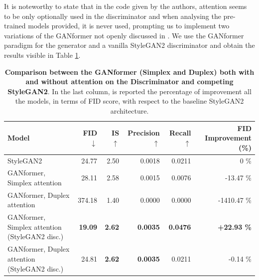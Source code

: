 \documentclass{article}
\begin{document}
	It is noteworthy to state that in the code given by the authors, attention seems to be only optionally 
	used in the discriminator and when analysing the pre-trained models provided, it is never used,
	prompting us to implement two variations of the GANformer not openly 
	discussed in \cite{hudson2021generative}.
	We use the GANformer paradigm for the generator and a vanilla StyleGAN2 discriminator and 
	obtain the results visible in Table \ref{tab:our-results2}.
	\begin{table}[htb]
		\centering
		\caption{\textbf{Comparison between the GANformer (Simplex and Duplex) both with and without 
				attention on the Discriminator and competing StyleGAN2}.  In the last column, is reported 
			the 
			percentage of improvement all the models, in terms of FID score, with respect to the baseline 
			StyleGAN2 architecture.}
		\label{tab:our-results2}
		\vspace{3mm}
		\small
		\begin{tabular}{l|rrrrr}
			\toprule
			
			\textbf{Model}  & \textbf{FID $\downarrow$}  & \textbf{IS $\uparrow$} & 
			\textbf{Precision$\uparrow$}  & \textbf{Recall $\uparrow$} & \textbf{FID Improvement (\%)}\\ 
			\midrule
			StyleGAN2                    &  24.77 & 2.50 & 0.0018 & 0.0211 & 0 \%\\ 
			GANformer, Simplex attention & 28.11 & 2.58 & 0.0015 & 0.0076 & -13.47 \%\\ 
			GANformer, Duplex attention  & 374.18 & 1.40 & 0.0000 & 0.0000 & -1410.47  \%\\ 
			GANformer, Simplex attention (StyleGAN2 disc.) & \textbf{19.09} &  \textbf{2.62}  &  
			\textbf{0.0035}    & \textbf{0.0476}  & \textbf{+22.93 \%} \\ 
			GANformer, Duplex attention (StyleGAN2 disc.)  &  24.81  & \textbf{2.62} &   \textbf{0.0035}   
			& 0.0211 & 
			-0.14 \%\\ 
			\bottomrule
		\end{tabular}
	\end{table}
	
\end{document}
